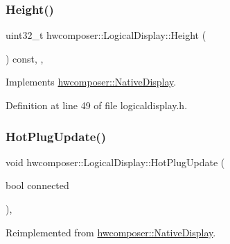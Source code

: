\subsubsection{\texorpdfstring{Height()}{Height()}}
{\footnotesize\ttfamily uint32\+\_\+t hwcomposer\+::\+Logical\+Display\+::\+Height (\begin{DoxyParamCaption}{ }\end{DoxyParamCaption}) const\hspace{0.3cm}{\ttfamily [inline]}, {\ttfamily [override]}, {\ttfamily [virtual]}}



Implements \mbox{\hyperlink{classhwcomposer_1_1NativeDisplay_a09a19377e64e1fed90ae8315a8e71864}{hwcomposer\+::\+Native\+Display}}.



Definition at line 49 of file logicaldisplay.\+h.


\begin{DoxyCode}{0}
\end{DoxyCode}
\mbox{\label{classhwcomposer_1_1LogicalDisplay_ab216be63c504dc281fa1da2f7825e059}} 
\subsubsection{\texorpdfstring{Hot\+Plug\+Update()}{HotPlugUpdate()}}
{\footnotesize\ttfamily void hwcomposer\+::\+Logical\+Display\+::\+Hot\+Plug\+Update (\begin{DoxyParamCaption}\item[{bool}]{connected }\end{DoxyParamCaption})\hspace{0.3cm}{\ttfamily [override]}, {\ttfamily [virtual]}}



Reimplemented from \mbox{\hyperlink{classhwcomposer_1_1NativeDisplay_a30e5c044e3a84ed23d2b3a5cec3f9037}{hwcomposer\+::\+Native\+Display}}.



